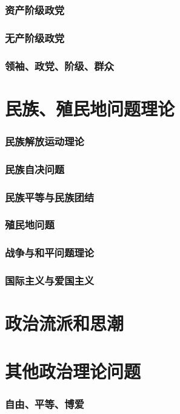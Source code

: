 \documentclass[UTF8]{../RepresentationUniverse}
\begin{document}
    \subsubsection{资产阶级政党}
    \subsubsection{无产阶级政党}
    \subsubsection{领袖、政党、阶级、群众}


\section{民族、殖民地问题理论}
    \subsubsection{民族解放运动理论}
    \subsubsection{民族自决问题}
    \subsubsection{民族平等与民族团结}
    \subsubsection{殖民地问题}
    \subsubsection{战争与和平问题理论}
    \subsubsection{国际主义与爱国主义}


\section{政治流派和思潮}


\section{其他政治理论问题}
    \subsubsection{自由、平等、博爱}
\end{document}

